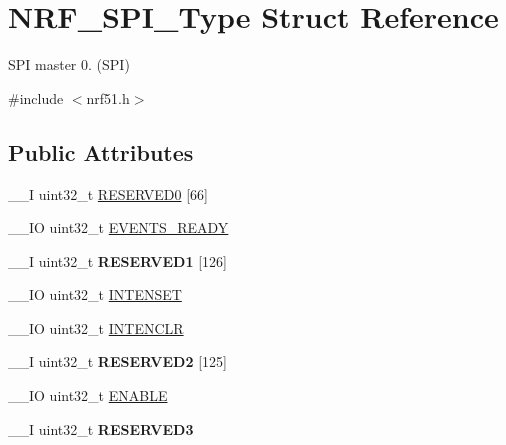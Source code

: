 \hypertarget{struct_n_r_f___s_p_i___type}{}\section{N\+R\+F\+\_\+\+S\+P\+I\+\_\+\+Type Struct Reference}
\label{struct_n_r_f___s_p_i___type}


S\+P\+I master 0. (S\+P\+I)  




{\ttfamily \#include $<$nrf51.\+h$>$}

\subsection*{Public Attributes}
\begin{DoxyCompactItemize}
\item 
\+\_\+\+\_\+\+I uint32\+\_\+t \hyperlink{struct_n_r_f___s_p_i___type_ac5e1a1da30ba6e437cf0f93270d10e2f}{R\+E\+S\+E\+R\+V\+E\+D0} \mbox{[}66\mbox{]}
\item 
\+\_\+\+\_\+\+I\+O uint32\+\_\+t \hyperlink{struct_n_r_f___s_p_i___type_aa961fb19bac5f946f5d022cf89bb87a4}{E\+V\+E\+N\+T\+S\+\_\+\+R\+E\+A\+D\+Y}
\item 
\hypertarget{struct_n_r_f___s_p_i___type_ac3018d37fe30ad67e1b82f232a9d5fe1}{}\+\_\+\+\_\+\+I uint32\+\_\+t {\bfseries R\+E\+S\+E\+R\+V\+E\+D1} \mbox{[}126\mbox{]}\label{struct_n_r_f___s_p_i___type_ac3018d37fe30ad67e1b82f232a9d5fe1}

\item 
\+\_\+\+\_\+\+I\+O uint32\+\_\+t \hyperlink{struct_n_r_f___s_p_i___type_ad7a6e2d7a2f044edc52df89edeed3154}{I\+N\+T\+E\+N\+S\+E\+T}
\item 
\+\_\+\+\_\+\+I\+O uint32\+\_\+t \hyperlink{struct_n_r_f___s_p_i___type_ab38b295ae2b356142e3a75ef036e1b32}{I\+N\+T\+E\+N\+C\+L\+R}
\item 
\hypertarget{struct_n_r_f___s_p_i___type_a64cfad978c1a0c8378020df5b3fb5af4}{}\+\_\+\+\_\+\+I uint32\+\_\+t {\bfseries R\+E\+S\+E\+R\+V\+E\+D2} \mbox{[}125\mbox{]}\label{struct_n_r_f___s_p_i___type_a64cfad978c1a0c8378020df5b3fb5af4}

\item 
\+\_\+\+\_\+\+I\+O uint32\+\_\+t \hyperlink{struct_n_r_f___s_p_i___type_a1c5757b7a62df90b6239346cf2ffb083}{E\+N\+A\+B\+L\+E}
\item 
\hypertarget{struct_n_r_f___s_p_i___type_ab617f717f4d75abb361fc3a2bc6e34ba}{}\+\_\+\+\_\+\+I uint32\+\_\+t {\bfseries R\+E\+S\+E\+R\+V\+E\+D3}\label{struct_n_r_f___s_p_i___type_ab617f717f4d75abb361fc3a2bc6e34ba}


\end{DoxyCompactItemize}

